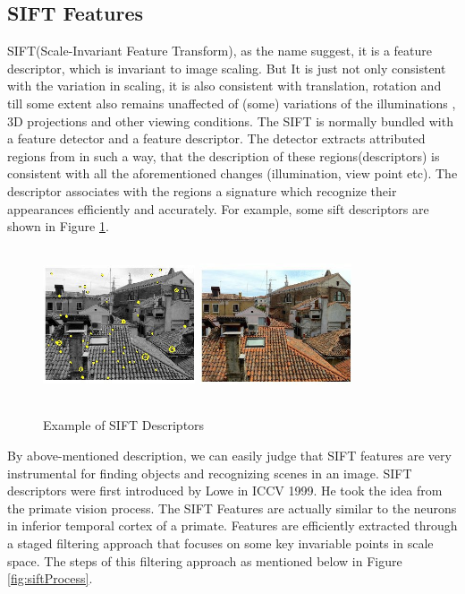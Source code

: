 \subsection{SIFT Features}
SIFT(Scale-Invariant Feature Transform), as the name suggest, it is a feature descriptor, which is invariant to image scaling. But It is just not only consistent with the variation in scaling, it is also consistent with translation, rotation and till some extent also remains unaffected of (some) variations of the illuminations , 3D projections and other viewing conditions. The SIFT is normally bundled with a feature detector and a feature descriptor. The detector extracts attributed regions from in such a way, that the description of these regions(descriptors) is consistent with all the aforementioned changes (illumination, view point etc). The descriptor associates with the regions a signature which recognize their appearances efficiently and accurately. For example, some sift descriptors are shown in Figure  \ref{fig:siftExample}.
 \begin{center}
\begin{figure}
\centering
\includegraphics[width=4.5cm, height=4.5cm]{./Pictures/SIFT/siftDescriptorExample.jpg}
\includegraphics[width=4.5cm, height=4.5cm]{./Pictures/SIFT/siftExample.jpg}
\caption{Example of SIFT Descriptors}
\label{fig:siftExample}
\end{figure}
\end{center}
By above-mentioned description, we can easily judge that SIFT features are very instrumental for finding objects and recognizing scenes in an image. SIFT descriptors were first introduced by Lowe \cite{lowe} in ICCV 1999. He took the idea from the primate vision process. The SIFT Features are actually similar to the neurons in inferior temporal cortex of a primate. Features are efficiently extracted through a staged filtering approach that focuses on some key invariable points in scale space. The steps of this filtering approach as mentioned below in Figure \ref{fig:siftProcess}.
